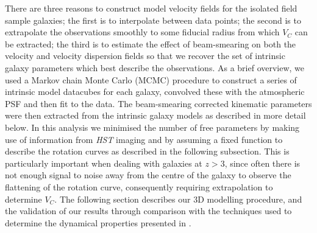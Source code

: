\documentclass[fleqn,usenatbib]{mnras}
\begin{document}
There are three reasons to construct model velocity fields for the isolated field sample galaxies; the first is to interpolate between data points; the second is to extrapolate the observations smoothly to some fiducial radius from which $V_{C}$ can be extracted; the third is to estimate the effect of beam-smearing on both the velocity and velocity dispersion fields so that we recover the set of intrinsic galaxy parameters which best describe the observations.
As a brief overview, we used a Markov chain Monte Carlo (MCMC) procedure to construct a series of intrinsic model datacubes for each galaxy, convolved these with the atmospheric PSF and then fit to the data.
The beam-smearing corrected kinematic parameters were then extracted from the intrinsic galaxy models as described in more detail below.
In this analysis we minimised the number of free parameters by making use of information from {\em HST} imaging and by assuming a fixed function to describe the rotation curves as described in the following subsection.    
This is particularly important when dealing with galaxies at $z > 3$, since often there is not enough signal to noise away from the centre of the galaxy to observe the flattening of the rotation curve, consequently requiring extrapolation to determine $V_{C}$.  
The following section describes our 3D modelling procedure, and the validation of our results through comparison with the techniques used to determine the dynamical properties presented in \cite{Harrison2017}.
\end{document}

